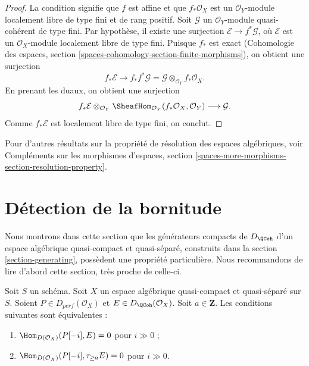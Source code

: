 \begin{proof}
La condition signifie que $f$ est affine et que $f_*\mathcal{O}_X$ est un
$\mathcal{O}_Y$-module localement libre de type fini et de rang positif.
Soit $\mathcal{G}$ un $\mathcal{O}_Y$-module quasi-coh\'erent de type fini.
Par hypoth\`ese, il existe une surjection
$\mathcal{E}\to f^*\mathcal{G}$, o\`u $\mathcal{E}$ est un
$\mathcal{O}_X$-module localement libre de type fini. Puisque $f_*$ est exact
(Cohomologie des espaces, section
\ref{spaces-cohomology-section-finite-morphisms}), on obtient une surjection
$$
f_*\mathcal{E}
\longrightarrow
f_*f^*\mathcal{G} = \mathcal{G} \otimes_{\mathcal{O}_Y} f_*\mathcal{O}_X.
$$
En prenant les duaux, on obtient une surjection
$$
f_*\mathcal{E}
\otimes_{\mathcal{O}_Y}
\SheafHom_{\mathcal{O}_Y}(f_*\mathcal{O}_X, \mathcal{O}_Y)
\longrightarrow
\mathcal{G}.
$$
Comme $f_*\mathcal{E}$ est localement libre de type fini, on conclut.
\end{proof}

\noindent
Pour d'autres r\'esultats sur la propri\'et\'e de r\'esolution des espaces
alg\'ebriques, voir Compl\'ements sur les morphismes d'espaces, section
\ref{spaces-more-morphisms-section-resolution-property}.












\section{D\'etection de la bornitude}
\label{section-detecting-boundedness}

\noindent
Nous montrons dans cette section que les g\'en\'erateurs compacts de $D_\QCoh$
d'un espace alg\'ebrique quasi-compact et quasi-s\'epar\'e, construits dans la
section \ref{section-generating}, poss\`edent une propri\'et\'e particuli\`ere.
Nous recommandons de lire d'abord cette section, tr\`es proche de celle-ci.

\begin{lemma}
\label{lemma-bounded-truncation}
Soit $S$ un sch\'ema.
Soit $X$ un espace alg\'ebrique quasi-compact et quasi-s\'epar\'e sur $S$.
Soient $P\in D_{perf}(\mathcal{O}_X)$ et
$E\in D_{\QCoh}(\mathcal{O}_X)$. Soit $a\in\mathbf{Z}$.
Les conditions suivantes sont \'equivalentes :
\begin{enumerate}
\item $\Hom_{D(\mathcal{O}_X)}(P[-i],E)=0$ pour $i\gg0$ ;
\item $\Hom_{D(\mathcal{O}_X)}(P[-i],\tau_{\geq a}E)=0$ pour $i\gg0$.
\end{enumerate}
\end{lemma}

